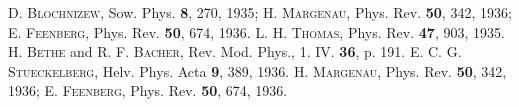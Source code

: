 \begin{thebibliography}{4}
\textsc{D. Blochnizew}, Sow. Phys. \textbf{8}, 270, 1935; \textsc{H. Margenau}, Phys. Rev. \textbf{50}, 342, 1936; \textsc{E. Feenberg}, Phys. Rev. \textbf{50}, 674, 1936.
\textsc{L. H. Thomas}, Phys. Rev. \textbf{47}, 903, 1935.
\textsc{H. Bethe} and \textsc{R. F. Bacher}, Rev. Mod. Phys., 1. IV. \textbf{36}, p. 191.
\textsc{E. C. G. Stueckelberg}, Helv. Phys. Acta \textbf{9}, 389, 1936. \textsc{H. Margenau}, Phys. Rev. \textbf{50}, 342, 1936; \textsc{E. Feenberg}, Phys. Rev. \textbf{50}, 674, 1936.
\end{thebibliography}